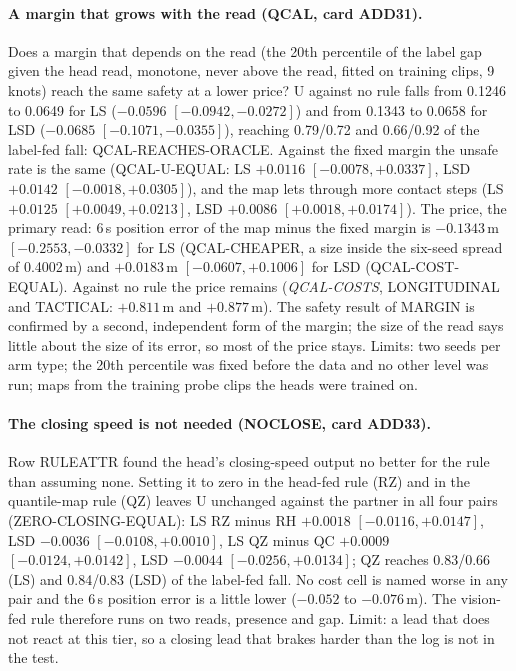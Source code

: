\paragraph{A margin that grows with the read (QCAL, card ADD31).} Does a margin that depends on the read (the 20th percentile of the label gap given the head read, monotone, never above the read, fitted on training clips, 9 knots) reach the same safety at a lower price? U against no rule falls from 0.1246 to 0.0649 for LS ($-0.0596$ $[-0.0942,-0.0272]$) and from 0.1343 to 0.0658 for LSD ($-0.0685$ $[-0.1071,-0.0355]$), reaching 0.79/0.72 and 0.66/0.92 of the label-fed fall: QCAL-REACHES-ORACLE. Against the fixed margin the unsafe rate is the same (QCAL-U-EQUAL: LS $+0.0116$ $[-0.0078,+0.0337]$, LSD $+0.0142$ $[-0.0018,+0.0305]$), and the map lets through more contact steps (LS $+0.0125$ $[+0.0049,+0.0213]$, LSD $+0.0086$ $[+0.0018,+0.0174]$). The price, the primary read: 6\,s position error of the map minus the fixed margin is $-0.1343$\,m $[-0.2553,-0.0332]$ for LS (QCAL-CHEAPER, a size inside the six-seed spread of 0.4002\,m) and $+0.0183$\,m $[-0.0607,+0.1006]$ for LSD (QCAL-COST-EQUAL). Against no rule the price remains (\emph{QCAL-COSTS}, LONGITUDINAL and TACTICAL: $+0.811$\,m and $+0.877$\,m). The safety result of MARGIN is confirmed by a second, independent form of the margin; the size of the read says little about the size of its error, so most of the price stays. Limits: two seeds per arm type; the 20th percentile was fixed before the data and no other level was run; maps from the training probe clips the heads were trained on.

\paragraph{The closing speed is not needed (NOCLOSE, card ADD33).} Row RULEATTR found the head's closing-speed output no better for the rule than assuming none. Setting it to zero in the head-fed rule (RZ) and in the quantile-map rule (QZ) leaves U unchanged against the partner in all four pairs (ZERO-CLOSING-EQUAL): LS RZ minus RH $+0.0018$ $[-0.0116,+0.0147]$, LSD $-0.0036$ $[-0.0108,+0.0010]$, LS QZ minus QC $+0.0009$ $[-0.0124,+0.0142]$, LSD $-0.0044$ $[-0.0256,+0.0134]$; QZ reaches 0.83/0.66 (LS) and 0.84/0.83 (LSD) of the label-fed fall. No cost cell is named worse in any pair and the 6\,s position error is a little lower ($-0.052$ to $-0.076$\,m). The vision-fed rule therefore runs on two reads, presence and gap. Limit: a lead that does not react at this tier, so a closing lead that brakes harder than the log is not in the test.

